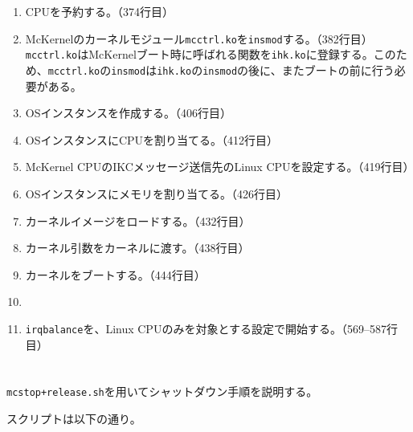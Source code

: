 \documentclass[twoside,11pt,fleqn]{book}
\begin{document}
\begin{enumerate}
\item CPUを予約する。（374行目）
\item McKernelのカーネルモジュール\texttt{mcctrl.ko}を\texttt{insmod}する。（382行目）\texttt{mcctrl.ko}はMcKernelブート時に呼ばれる関数を\texttt{ihk.ko}に登録する。このため、\texttt{mcctrl.ko}の\texttt{insmod}は\texttt{ihk.ko}の\texttt{insmod}の後に、またブートの前に行う必要がある。
\item OSインスタンスを作成する。（406行目）
\item OSインスタンスにCPUを割り当てる。（412行目）
\item McKernel CPUのIKCメッセージ送信先のLinux CPUを設定する。（419行目）
\item OSインスタンスにメモリを割り当てる。（426行目）
\item カーネルイメージをロードする。（432行目）
\item カーネル引数をカーネルに渡す。（438行目）
\item カーネルをブートする。（444行目）
\item {}
\item \texttt{irqbalance}を、Linux CPUのみを対象とする設定で開始する。（569--587行目）
\end{enumerate}

\section{}
\texttt{mcstop+release.sh}を用いてシャットダウン手順を説明する。

スクリプトは以下の通り。
\nolinenumbers
\scriptsize

\normalsize
\linenumbers
\end{document}
